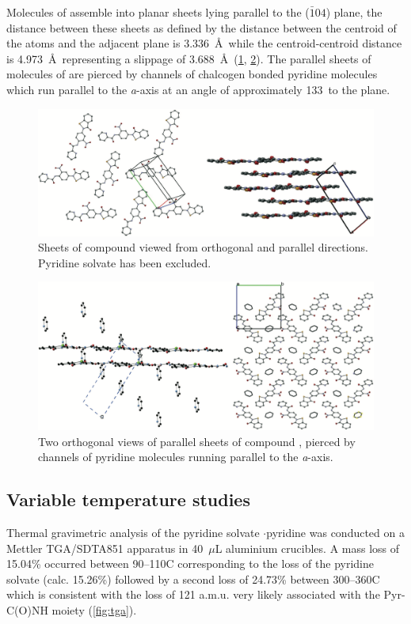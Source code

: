 \begin{refsection}
Molecules of  assemble into planar sheets lying parallel to the ($\bar{1} 0 4$) plane, the distance between these sheets as defined by the distance between the centroid of the atoms  and the adjacent plane is 3.336~\AA~while the centroid-centroid distance is 4.973~\AA~representing a slippage of 3.688~\AA~(\cref{fig:ebs-nitroamide-2py-sheets-1}, \cref{fig:ebs-nitroamide-2py-sheets-2}).
The parallel sheets of molecules of  are pierced by channels of chalcogen bonded pyridine molecules which run parallel to the \emph{a}-axis at an angle of approximately 133\degree~to the plane.

\begin{figure}
    \centering
    \includegraphics[width=0.8\linewidth]{Figures/ebs-nitroamide-2py-sheets-1.pdf}
    \caption{Sheets of compound  viewed from orthogonal and parallel directions. Pyridine solvate has been excluded.}
    \label{fig:ebs-nitroamide-2py-sheets-1}
\end{figure}

\begin{figure}
    \centering
    \includegraphics[width=0.8\linewidth]{Figures/ebs-nitroamide-2py-sheets-2.pdf}
    \caption{Two orthogonal views of parallel sheets of compound , pierced by channels of pyridine molecules running parallel to the \emph{a}-axis.}
    \label{fig:ebs-nitroamide-2py-sheets-2}
\end{figure}

\subsection{Variable temperature studies}
Thermal gravimetric analysis of the pyridine solvate $\cdot$pyridine was conducted on a Mettler TGA/SDTA851 apparatus in 40~$\mu$L aluminium crucibles. 
A mass loss of 15.04\% occurred between 90--110\degree C corresponding to the loss of the pyridine solvate (calc. 15.26\%) followed by a second loss of 24.73\% between 300--360\degree C which is consistent with the loss of 121 a.m.u. very likely associated with the Pyr-C(O)NH moiety (\cref{fig:tga}).


\end{refsection}
